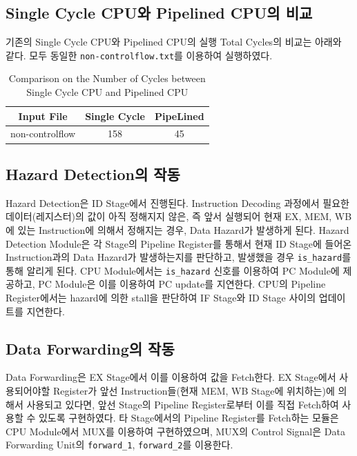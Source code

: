 \documentclass[openright, a4paper]{article}
\newcommand{\code}[1]{\texttt{#1}}
\begin{document}
\subsection{Single Cycle CPU와 Pipelined CPU의 비교}

기존의 Single Cycle CPU와 Pipelined CPU의 실행 Total Cycles의 비교는 아래와 같다. 모두 동일한 \code{non-controlflow.txt}를 이용하여 실행하였다.

\begin{table}[!h]
  \centering
  \begin{tabular}{@{}ccc@{}}
    \hline
    Input File & Single Cycle & PipeLined\\
    \hline
    non-controlflow & 158 & 45 \\
    \hline
  \end{tabular}
  \caption{Comparison on the Number of Cycles between Single Cycle CPU and Pipelined CPU}
  \label{tab:comparison}
\end{table}

\subsection{Hazard Detection의 작동}

Hazard Detection은 ID Stage에서 진행된다. 
Instruction Decoding 과정에서 필요한 데이터(레지스터)의 값이 아직 정해지지 않은, 즉 앞서 실행되어 현재 EX, MEM, WB에 있는 Instruction에 의해서 정해지는 경우, Data Hazard가 발생하게 된다. 
Hazard Detection Module은 각 Stage의 Pipeline Register를 통해서 현재 ID Stage에 들어온 Instruction과의 Data Hazard가 발생하는지를 판단하고, 발생했을 경우 \code{is_hazard}를 통해 알리게 된다.
CPU Module에서는 \code{is_hazard} 신호를 이용하여 PC Module에 제공하고, PC Module은 이를 이용하여 PC update를 지연한다. CPU의 Pipeline Register에서는 hazard에 의한 stall을 판단하여 IF Stage와 ID Stage 사이의 업데이트를 지연한다.

\subsection{Data Forwarding의 작동}

Data Forwarding은 EX Stage에서 이를 이용하여 값을 Fetch한다.
EX Stage에서 사용되어야할 Register가 앞선 Instruction들(현재 MEM, WB Stage에 위치하는)에 의해서 사용되고 있다면, 앞선 Stage의 Pipeline Register로부터 이를 직접 Fetch하여 사용할 수 있도록 구현하였다.
타 Stage에서의 Pipeline Register를 Fetch하는 모듈은 CPU Module에서 MUX를 이용하여 구현하였으며, MUX의 Control Signal은 Data Forwarding Unit의 \code{forward_1}, \code{forward_2}를 이용한다.
\end{document}
